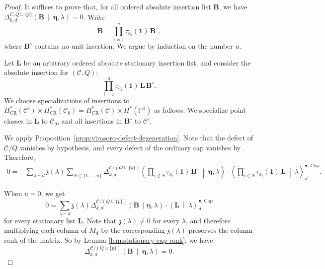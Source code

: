 \documentclass[letterpaper,12pt]{amsart}
\theoremstyle{definition}
\newcommand{\id}{\mathbf 1}
\newcommand{\cC}{\mathcal C}
\newcommand{\CR}{\mathrm{CR}}
\numberwithin{equation}{section}
\begin{document}
\begin{proof}
It suffices to prove that, for all ordered absolute insertion list $\mathbf B$, we have
\(\Delta_{k,d}^{C,Q\cup\{p\}}
\left(
\mathbf B
\ \middle|\
\boldsymbol\eta,\lambda
\right)
=0.\) Write
\[
\mathbf B=
\prod_{i=1}^{u}\tau_{a_i}(\id)\,\mathbf B^\circ,
\]
where \(\mathbf B^\circ\) contains no unit insertion. We argue by induction on the number \(u\).



Let \(\mathbf L\) be an arbitrary ordered absolute stationary insertion list, and consider the absolute insertion for $(\mathcal C,Q)$:
\[
\prod_{i=1}^{u}\tau_{a_i}(\id)\,\mathbf L\,\mathbf B^\circ.
\]
We choose specializations of insertions to $H^*_{\CR}(\mathcal C')\times H^*_{\CR}(\cC_0)=H^*_{\CR}(\cC)\times H^*(\mathbb P^1)$ as follows.
We specialize point classes in $\mathbf L$ to $\mathcal C_0$, and all insertions in
\(\mathbf B^\circ\) to $\cC'$.

We apply Proposition~\ref{prop:virasoro-defect-degeneration}. Note that
the defect of \(\mathcal C/Q\) vanishes by hypothesis, and every defect of the
ordinary cap vanishes by \cite{OP3}. Therefore,
\begin{equation}
\label{eq:cap-inversion-triangular-system}
\begin{aligned}
0
={}&
\sum_{\lambda\vdash d}
\mathfrak z(\lambda)
\sum_{S\subset\{1,\ldots,u\}}
\Delta_{k,d}^{\mathcal C/(Q\cup\{p\})}
\left(
\prod_{i\notin S}\tau_{a_i}(\id)\,
\mathbf B^\circ
\ \middle|\
\boldsymbol{\eta},\lambda
\right)\cdot
\left\langle
\prod_{i\in S}\tau_{a_i}(\id)\,
\mathbf L
\ \middle|\
\lambda
\right\rangle^{\bullet,\,\mathrm{Cap}}_d.
\end{aligned}
\end{equation}

When \(u=0\), we get
\begin{equation*}
0=
\sum_{\lambda\vdash d}
\mathfrak z(\lambda)
\Delta_{k,d}^{\cC/(Q\cup\{p\})}
\left(
\mathbf B
\ \middle|\boldsymbol{\eta},\lambda
\right)\cdot\left\langle
\mathbf L
\ \middle|\
\lambda
\right\rangle^{\bullet,\,\mathrm{Cap}}_d
\end{equation*}
for every stationary list \(\mathbf L\). Note that \(\mathfrak z(\lambda)\neq0\) for every \(\lambda\), and therefore
multiplying each column of \(M_d\) by the corresponding
\(\mathfrak z(\lambda)\) preserves the column rank of the matrix. So by Lemma \ref{lem:stationary-cap-rank}, we have
\[
\Delta_{k,d}^{\mathcal C/(Q\cup\{p\})}
\left(
\mathbf B
\ \middle|\
\boldsymbol{\eta},\lambda
\right)
=0.
\]


\end{proof}
\end{document}
